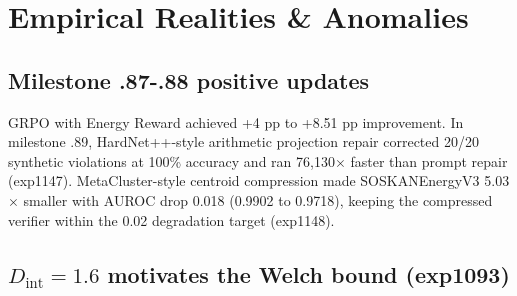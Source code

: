 \section{Empirical Realities \& Anomalies}
\subsection{Milestone .87-.88 positive updates}
GRPO with Energy Reward achieved +4 pp to +8.51 pp improvement.
In milestone .89, HardNet++-style arithmetic projection repair corrected 20/20 synthetic violations at 100\% accuracy and ran 76{,}130$\times$ faster than prompt repair (exp1147).
MetaCluster-style centroid compression made SOSKANEnergyV3 5.03$\times$ smaller with AUROC drop 0.018 (0.9902 to 0.9718), keeping the compressed verifier within the 0.02 degradation target (exp1148).
\subsection{$D_{\mathrm{int}} = 1.6$ motivates the Welch bound (exp1093)}
